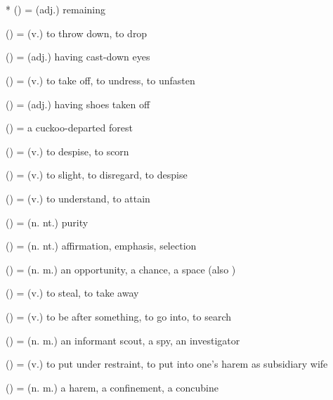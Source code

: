 \section*{}\label{upasagga:ava}
\begin{compactitem}
\item {}* () = (adj.) remaining
\item {} () = (v.) to throw down, to drop 
\item {} () = (adj.) having cast-down eyes
\item {} () = (v.) to take off, to undress, to unfasten 
\item {} () = (adj.) having shoes taken off 
\item {} () = a cuckoo-departed forest
\item {} () = (v.) to despise, to scorn
\item {} () = (v.) to slight, to disregard, to despise
\item {} () = (v.) to understand, to attain 
\item {} () = (n. nt.) purity 
\item {} () = (n. nt.) affirmation, emphasis, selection 
\item {} () = (n. m.) an opportunity, a chance, a space (also )
\item {} () = (v.) to steal, to take away
\item {} () = (v.) to be after something, to go into, to search
\item {} () = (n. m.) an informant scout, a spy, an investigator
\item {} () = (v.) to put under restraint, to put into one's harem as subsidiary wife
\item {} () = (n. m.) a harem, a confinement, a concubine
\end{compactitem}

